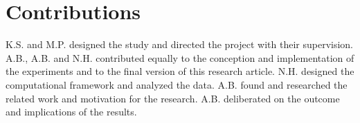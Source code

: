 
\section{Contributions}
K.S. and M.P. designed the study and directed the project with their supervision. A.B., A.B. and N.H. contributed equally to the conception and implementation of the experiments and to the final version of this research article. N.H. designed the computational framework and analyzed the data. A.B. found and researched the related work and motivation for the research. A.B. deliberated on the outcome and implications of the results.
